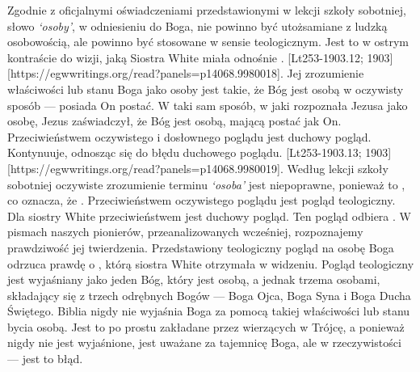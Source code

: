 Zgodnie z oficjalnymi oświadczeniami przedstawionymi w lekcji szkoły sobotniej, słowo \textit{‘osoby’}, w odniesieniu do Boga, nie powinno być utożsamiane z ludzką osobowością, ale powinno być stosowane w sensie teologicznym. Jest to w ostrym kontraście do wizji, jaką Siostra White miała odnośnie . [Lt253-1903.12; 1903][https://egwwritings.org/read?panels=p14068.9980018]. Jej zrozumienie właściwości lub stanu Boga jako osoby jest takie, że Bóg jest osobą w oczywisty sposób — posiada On postać. W taki sam sposób, w jaki rozpoznała Jezusa jako osobę, Jezus zaświadczył, że Bóg jest osobą, mającą postać jak On. Przeciwieństwem oczywistego i dosłownego poglądu jest duchowy pogląd. Kontynuuje, odnosząc się do błędu duchowego poglądu. [Lt253-1903.13; 1903][https://egwwritings.org/read?panels=p14068.9980019]. Według lekcji szkoły sobotniej oczywiste zrozumienie terminu \textit{‘osoba’} jest niepoprawne, ponieważ to , co oznacza, że . Przeciwieństwem oczywistego poglądu jest pogląd teologiczny. Dla siostry White przeciwieństwem jest duchowy pogląd. Ten pogląd odbiera . W pismach naszych pionierów, przeanalizowanych wcześniej, rozpoznajemy prawdziwość jej twierdzenia. Przedstawiony teologiczny pogląd na osobę Boga odrzuca prawdę o , którą siostra White otrzymała w widzeniu. Pogląd teologiczny jest wyjaśniany jako jeden Bóg, który jest osobą, a jednak trzema osobami, składający się z trzech odrębnych Bogów — Boga Ojca, Boga Syna i Boga Ducha Świętego. Biblia nigdy nie wyjaśnia Boga za pomocą takiej właściwości lub stanu bycia osobą. Jest to po prostu zakładane przez wierzących w Trójcę, a ponieważ nigdy nie jest wyjaśnione, jest uważane za tajemnicę Boga, ale w rzeczywistości — jest to błąd.

